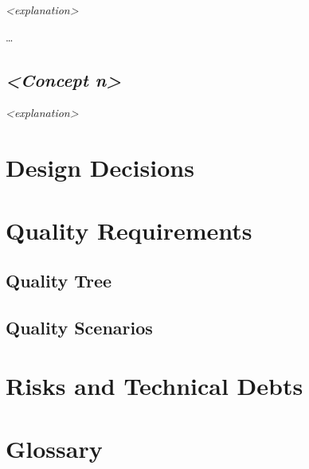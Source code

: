\emph{\textless{}explanation\textgreater{}}

\ldots{}

\subsection{\texorpdfstring{\emph{\textless{}Concept
n\textgreater{}}}{\textless{}Concept n\textgreater{}}}\label{__emphasis_concept_n_emphasis}

\emph{\textless{}explanation\textgreater{}}

\section{Design Decisions}\label{section-design-decisions}

\section{Quality Requirements}\label{section-quality-scenarios}

\subsection{Quality Tree}\label{_quality_tree}

\subsection{Quality Scenarios}\label{_quality_scenarios}

\section{Risks and Technical Debts}\label{section-technical-risks}

\section{Glossary}\label{section-glossary}

